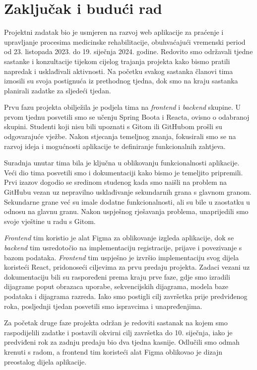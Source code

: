 \chapter{Zaključak i budući rad}
		
				

  Projektni zadatak bio je usmjeren na razvoj web aplikacije za praćenje i upravljanje procesima medicinske rehabilitacije, obuhvaćajući vremenski period od 23. listopada 2023. do 19. siječnja 2024. godine. Redovito smo održavali tjedne sastanke i konzultacije tijekom cijelog trajanja projekta kako bismo pratili napredak i usklađivali aktivnosti. Na početku svakog sastanka članovi tima iznosili su svoja postignuća iz prethodnog tjedna, dok smo na kraju sastanka planirali zadatke za sljedeći tjedan.

Prvu fazu projekta obilježila je podjela tima na \textit{frontend} i \textit{backend} skupine. U prvom tjednu posvetili smo se učenju Spring Boota i Reacta, ovisno o odabranoj skupini. Studenti koji nisu bili upoznati s Gitom ili GitHubom prošli su odgovarajuće vježbe. Nakon stjecanja temeljnog znanja, fokusirali smo se na razvoj ideja i mogućnosti aplikacije te definiranje funkcionalnih zahtjeva.

Suradnja unutar tima bila je ključna u oblikovanju funkcionalnosti aplikacije. Veći dio tima posvetili smo i dokumentaciji kako bismo je temeljito pripremili. Prvi izazov dogodio se sredinom studenog kada smo naišli na problem na GitHubu vezan uz nepravilno usklađivanje sekundarnih grana s glavnom granom. Sekundarne grane već su imale dodatne funkcionalnosti, ali su bile u zaostatku u odnosu na glavnu granu. Nakon uspješnog rješavanja problema, unaprijedili smo svoje vještine u radu s Gitom.

\textit{Frontend} tim koristio je alat Figma za oblikovanje izgleda aplikacije, dok se \textit{backend} tim usredotočio na implementaciju registracije, prijave i povezivanje s bazom podataka. \textit{Frontend} tim uspješno je izvršio implementaciju svog dijela koristeći React, pridonoseći ciljevima za prvu predaju projekta. Zadaci vezani uz dokumentaciju bili su raspoređeni prema kraju prve faze, gdje smo izradili dijagrame poput obrazaca uporabe, sekvencijskih dijagrama, modela baze podataka i dijagrama razreda. Iako smo postigli cilj završetka prije predviđenog roka, posljednji tjedan posvetili smo ispravcima i unapređenjima.

Za početak druge faze projekta održan je redoviti sastanak na kojem smo raspodijelili zadatke i postavili okvirni cilj završetka do 10. siječnja, iako je predviđeni rok za zadnju predaju bio dva tjedna kasnije. Odlučili smo odmah krenuti s radom, a frontend tim koristeći alat Figma oblikovao je dizajn preostalog dijela aplikacije.

